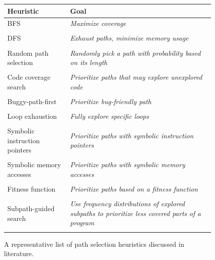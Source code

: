 \begin{figure}[t]
  \centering
  \begin{adjustbox}{width=1\columnwidth}
  \begin{small}
  \begin{tabular}{| l || l |}
    \hline      
    {\bf Heuristic} & {\bf Goal} \\ \hline\hline
    BFS & {\em Maximize coverage} \\ & \cite{CKC-TOCS12,PEX-TAP08} \\\hline
    DFS & {\em Exhaust paths, minimize memory usage} \\ & \cite{EXE-CCS06,CKC-TOCS12,PEX-TAP08,DART-PLDI05} \\\hline
    Random path selection & {\em Randomly pick a path with probability based on its length} \\ & \cite{KLEE-OSDI08} \\\hline
    Code coverage search & {\em Prioritize paths that may explore unexplored code} \\ & \cite{EXE-CCS06,KLEE-OSDI08,MAYHEM-SP12,CKC-TOCS12,GV-ISSTA02} \\\hline
    Buggy-path-first & {\em Prioritize bug-friendly path} \\ & \cite{AEG-NDSS11} \\\hline
    Loop exhaustion & {\em Fully explore specific loops} \\ & \cite{AEG-NDSS11} \\\hline
    Symbolic instruction pointers & {\em Prioritize paths with symbolic instruction pointers} \\ & \cite{MAYHEM-SP12} \\\hline
    Symbolic memory accesses & {\em Prioritize paths with symbolic memory accesses} \\ & \cite{MAYHEM-SP12} \\ \hline
    Fitness function & {\em Prioritize paths based on a fitness function} \\ & \cite{XTD-DSN09,CS-CACM13,XTD-DSN09} \\ \hline
    Subpath-guided search & {\em Use frequency distributions of explored subpaths to prioritize less covered parts of a program} \\ & \cite{LZL-OOPSLA13} \\
    \hline  
  \end{tabular}
  \end{small}
  \end{adjustbox}
  \caption{A representative list of path selection heuristics discussed in literature.}
  \label{tab:heuristics}
\end{figure}


